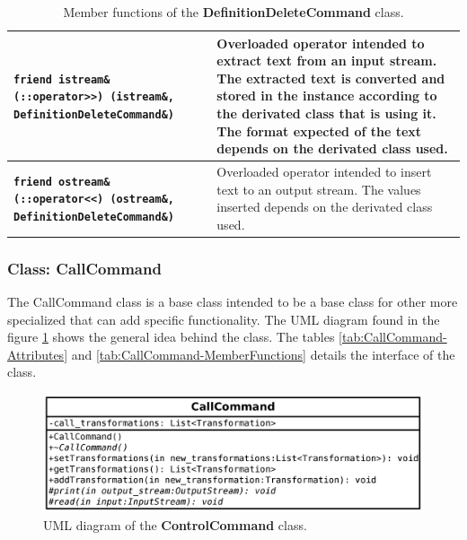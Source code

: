 \documentclass[11pt,twoside,openany,x11names,svgnames]{memoir}
\begin{document}
\begin{table}[h]
\begin{tabular}{| >{\bfseries}p{7.5cm} | p{8cm} |}
	\hline
	
	\texttt{friend istream\& (::operator>>) (istream\&, DefinitionDeleteCommand\&)} & Overloaded operator intended to extract text from an input stream. The extracted text is converted and stored in the instance according to the derivated class that is using it. The format expected of the text depends on the derivated class used. \\
	
	\hline
	
	\texttt{friend ostream\& (::operator<<) (ostream\&, DefinitionDeleteCommand\&)} & Overloaded operator intended to insert text to an output stream. The values inserted depends on the derivated class used. \\
	
	\hline
\end{tabular}
\caption{Member functions of the \textbf{DefinitionDeleteCommand} class.}
\label{tab:DefinitionDeleteCommand-MemberFunctions}
\end{table}

\clearpage

\subsubsection{Class: CallCommand}\label{Class-CallCommand}

The CallCommand class is a base class intended to be a base class for other more specialized that can add specific functionality. The UML diagram found in the figure \ref{fig:class-call-command} shows the general idea behind the class. The tables \ref{tab:CallCommand-Attributes} and \ref{tab:CallCommand-MemberFunctions} details the interface of the class.

\begin{figure}
	\centering
	\includegraphics[scale=0.2, clip=true, trim= 0pt 0pt 0pt 0pt]{images/chapter03-image27}
	\caption{UML diagram of the \textbf{ControlCommand} class.}
	\label{fig:class-call-command}
\end{figure}
\end{document}
